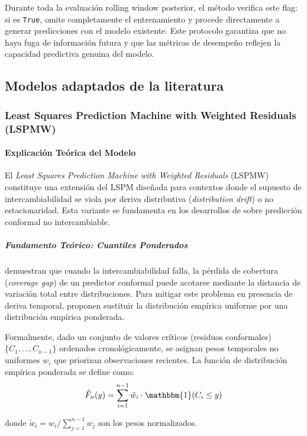 Durante toda la evaluación rolling window posterior, el método verifica este flag: si es \texttt{True}, omite completamente el entrenamiento y procede directamente a generar predicciones con el modelo existente. Este protocolo garantiza que no haya fuga de información futura y que las métricas de desempeño reflejen la capacidad predictiva genuina del modelo.


\subsection{Modelos adaptados de la literatura}

\subsubsection{Least Squares Prediction Machine with Weighted Residuals (LSPMW)}
\label{subsec:LSPMW}
\paragraph{Explicación Teórica del Modelo}

El \textit{Least Squares Prediction Machine with Weighted Residuals} (LSPMW) constituye una extensión del LSPM diseñada para contextos donde el supuesto de intercambiabilidad se viola por deriva distributiva (\textit{distribution drift}) o no estacionaridad. Esta variante se fundamenta en los desarrollos de \textcite{Barber2023} sobre predicción conformal no intercambiable.

\subparagraph{Fundamento Teórico: Cuantiles Ponderados}
\textcite{Barber2023} demuestran que cuando la intercambiabilidad falla, la pérdida de cobertura (\textit{coverage gap}) de un predictor conformal puede acotarse mediante la distancia de variación total entre distribuciones. Para mitigar este problema en presencia de deriva temporal, proponen sustituir la distribución empírica uniforme por una distribución empírica ponderada.

Formalmente, dado un conjunto de valores críticos (residuos conformales) $\{C_1, \dots, C_{n-1}\}$ ordenados cronológicamente, se asignan pesos temporales no uniformes $w_i$ que priorizan observaciones recientes. La función de distribución empírica ponderada se define como:
\begin{equation}
\hat{F}_n(y) = \sum_{i=1}^{n-1} \tilde{w}_i \cdot \mathbbm{1}(C_i \leq y)
\end{equation}

donde $\tilde{w}_i = w_i / \sum_{j=1}^{n-1} w_j$ son los pesos normalizados.


